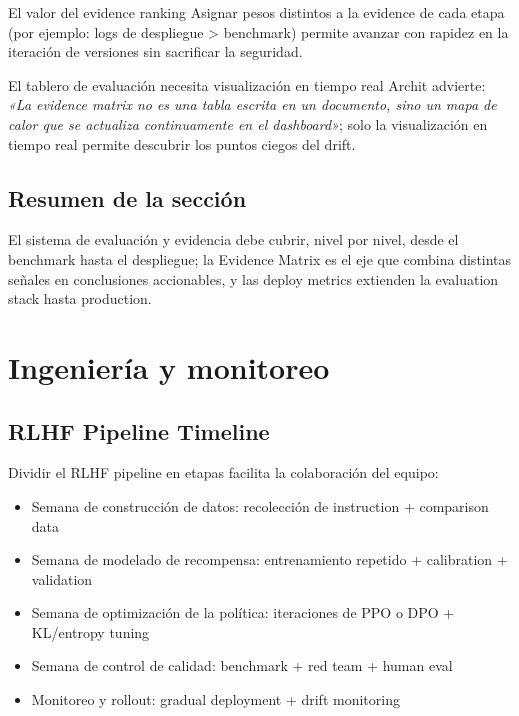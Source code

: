 \documentclass[a4paper]{article}
\begin{document}
\begin{knowledgebox}{El valor del evidence ranking}
Asignar pesos distintos a la evidence de cada etapa (por ejemplo: logs de despliegue > benchmark) permite avanzar con rapidez en la iteración de versiones sin sacrificar la seguridad.
\end{knowledgebox}

\begin{importantbox}{El tablero de evaluación necesita visualización en tiempo real}
Archit advierte: \textit{«La evidence matrix no es una tabla escrita en un documento, sino un mapa de calor que se actualiza continuamente en el dashboard»}; solo la visualización en tiempo real permite descubrir los puntos ciegos del drift.
\end{importantbox}

\subsection{Resumen de la sección}

El sistema de evaluación y evidencia debe cubrir, nivel por nivel, desde el benchmark hasta el despliegue; la Evidence Matrix es el eje que combina distintas señales en conclusiones accionables, y las deploy metrics extienden la evaluation stack hasta production.
\section{Ingeniería y monitoreo}

\subsection{RLHF Pipeline Timeline}

Dividir el RLHF pipeline en etapas facilita la colaboración del equipo:

\begin{itemize}
    \item Semana de construcción de datos: recolección de instruction + comparison data
    \item Semana de modelado de recompensa: entrenamiento repetido + calibration + validation
    \item Semana de optimización de la política: iteraciones de PPO o DPO + KL/entropy tuning
    \item Semana de control de calidad: benchmark + red team + human eval
    \item Monitoreo y rollout: gradual deployment + drift monitoring
\end{itemize}
\end{document}
